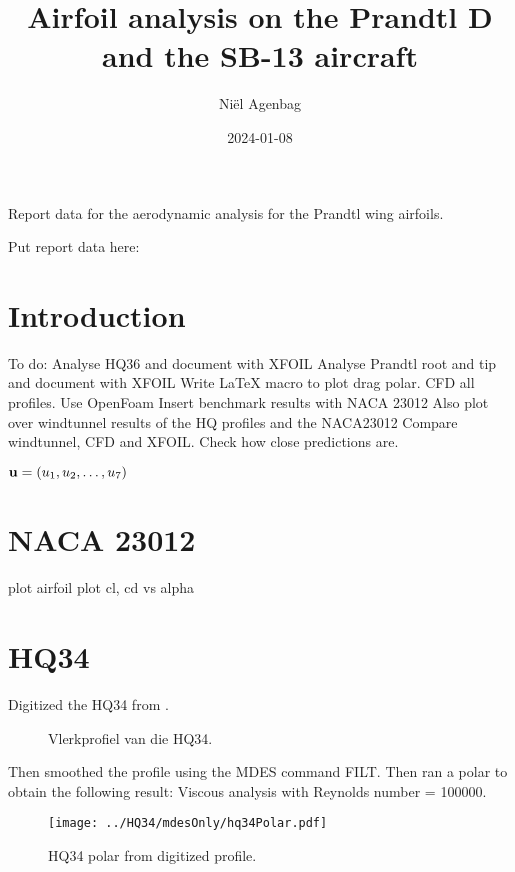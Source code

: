 \documentclass{article}
\title{Airfoil analysis on the Prandtl D and the SB-13 aircraft}
\author{Ni\"el Agenbag}
\date{2024-01-08}
\begin{document}
\maketitle

Report data for the aerodynamic analysis for the Prandtl wing airfoils.

Put report data here:

\section{Introduction}


To do:
Analyse HQ36 and document with XFOIL
Analyse Prandtl root and tip and document with XFOIL
Write LaTeX macro to plot drag polar.
CFD all profiles.  Use OpenFoam
Insert benchmark results with NACA 23012
Also plot over windtunnel results of the HQ profiles and the NACA23012
Compare windtunnel, CFD and XFOIL.  Check how close predictions are.

$\mathbf u=(u_1,u_2,\ldots,u_{7})$


\section{NACA 23012}

plot airfoil
plot cl, cd vs alpha

\section{HQ34}

Digitized the HQ34 from .


\begin{figure}[H]
	\begin{center}
	\end{center}
	\caption{Vlerkprofiel van die HQ34.}
	\label{Fig: Vlerkprofiel HQ34}
\end{figure}


Then smoothed the profile using the MDES command FILT.
Then ran a polar to obtain the following result:
Viscous analysis with Reynolds number = 100000.

\begin{figure}[H]
\centering
\texttt{[image: ../HQ34/mdesOnly/hq34Polar.pdf]}
\caption{HQ34 polar from digitized profile.}
\end{figure}
\end{document}
